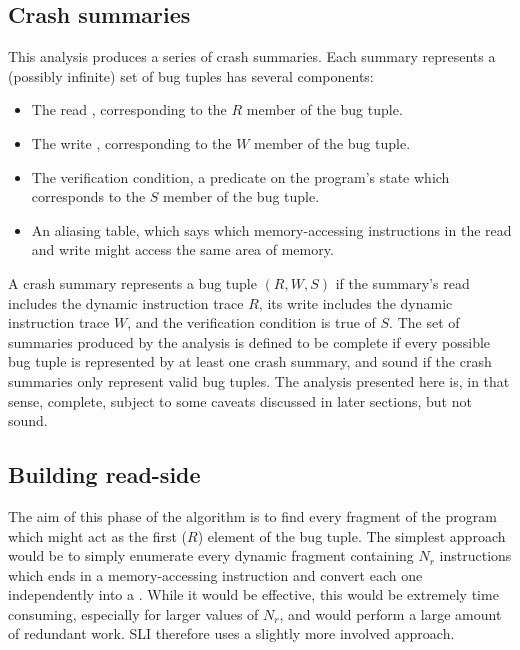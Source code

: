 \label{sect:monotonicity}


\subsection{Crash summaries}

This analysis produces a series of crash summaries.
Each summary represents a (possibly infinite) set of bug tuples has several components:

\begin{itemize}
\item The read \StateMachine, corresponding to the $R$ member of the bug tuple.
\item The write \StateMachine, corresponding to the $W$ member of the bug tuple.
\item The verification condition, a predicate on the program's state which corresponds to the $S$ member of the bug tuple.
\item An aliasing table, which says which memory-accessing instructions in the read and write \StateMachines might access the same area of memory.
\end{itemize}

A crash summary represents a bug tuple $(R, W, S)$ if the summary's read \StateMachine includes the dynamic instruction trace $R$, its write \StateMachine includes the dynamic instruction trace $W$, and the verification condition is true of $S$.
The set of summaries produced by the analysis is defined to be complete if every possible bug tuple is represented by at least one crash summary, and sound if the crash summaries only represent valid bug tuples.
The analysis presented here is, in that sense, complete, subject to some caveats discussed in later sections, but not sound.

\subsection{Building read-side \StateMachines}

The aim of this phase of the algorithm is to find every fragment of the program which might act as the first ($R$) element of the bug tuple.
The simplest approach would be to simply enumerate every dynamic fragment containing $N_r$ instructions which ends in a memory-accessing instruction and convert each one independently into a \StateMachine.
While it would be effective, this would be extremely time consuming, especially for larger values of $N_r$, and would perform a large amount of redundant work.
SLI therefore uses a slightly more involved approach.

